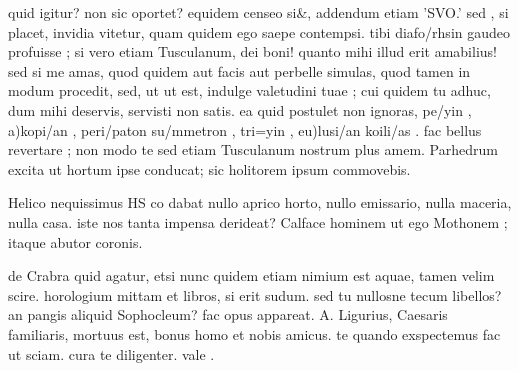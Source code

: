 


 quid igitur? non sic oportet? equidem censeo si&, addendum etiam 'SVO.' sed , si placet, invidia vitetur, quam quidem ego saepe contempsi. tibi diafo/rhsin gaudeo profuisse ; si vero etiam Tusculanum, dei boni! quanto mihi illud erit amabilius! sed si me amas, quod quidem aut facis aut perbelle simulas, quod tamen in modum procedit, sed, ut ut est, indulge valetudini tuae ; cui quidem tu adhuc, dum mihi deservis, servisti non satis. ea quid postulet non ignoras, pe/yin , a)kopi/an , peri/paton su/mmetron , tri=yin , eu)lusi/an koili/as . fac bellus revertare ; non modo te sed etiam Tusculanum nostrum plus amem. Parhedrum excita ut hortum ipse conducat; sic holitorem ipsum commovebis.

 Helico nequissimus HS co dabat nullo aprico horto, nullo emissario, nulla maceria, nulla casa. iste nos tanta impensa derideat? Calface hominem ut ego Mothonem ; itaque abutor coronis.

 de Crabra quid agatur, etsi nunc quidem etiam nimium est aquae, tamen velim scire. horologium mittam et libros, si erit sudum. sed tu nullosne tecum libellos? an pangis aliquid Sophocleum? fac opus appareat. A. Ligurius, Caesaris familiaris, mortuus est, bonus homo et nobis amicus. te quando exspectemus fac ut sciam. cura te diligenter. vale .
